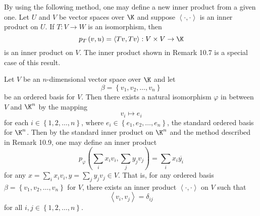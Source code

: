 \documentclass[linearalgebra]{subfiles}
\begin{document}
    \begin{remark}
        By using the following method, one may define a new inner product from a given one. Let $U$ and $V$ be vector spaces over $\K$ and suppose $\left\langle \cdot, \cdot\right\rangle $ is an inner product on $U$. If $T:V\to W$ is an isomorphism, then
        \begin{equation*}
            p_T\left( v,u \right) = \left\langle Tv, Tv\right\rangle : V\times V\to\K
        \end{equation*}
        is an inner product on $V$. The inner product shown in Remark 10.7 is a special case of this result.
    \end{remark}

    \begin{example}
        Let $V$ be an $n$-dimensional vector space over $\K$ and let
        \begin{equation*}
            \beta = \left\lbrace v_1,v_2,\ldots,v_n \right\rbrace 
        \end{equation*}
        be an ordered basis for $V$. Then there exists a natural isomorphism $\varphi$ in between $V$ and $\K^n$ by the mapping
        \begin{equation*}
            v_i\mapsto e_i
        \end{equation*}
        for each $i\in\left\lbrace 1,2,\ldots,n \right\rbrace$, where $e_i\in\left\lbrace e_1,e_2,\ldots,e_n \right\rbrace$, the standard ordered basis for $\K^n$. Then by the standard inner product on $\K^n$ and the method described in Remark 10.9, one may define an inner product
        \begin{equation*}
            p_\varphi\left( \sum^{}_{i} x_iv_i, \sum^{}_{j} y_jv_j \right) = \sum^{}_{i} x_i\overline{y_i}
        \end{equation*}
        for any $x = \sum^{}_{i} x_iv_i, y = \sum^{}_{j} y_jv_j\in V$. That is, for any ordered basis $\beta = \left\lbrace v_1,v_2,\ldots,v_n \right\rbrace$ for $V$, there exists an inner product $\left\langle \cdot, \cdot\right\rangle $ on $V$ such that
        \begin{equation*}
            \left\langle v_i, v_j\right\rangle  = \delta_{ij}
        \end{equation*}
        for all $i,j\in\left\lbrace 1,2,\ldots,n \right\rbrace$.
    \end{example}
\end{document}
